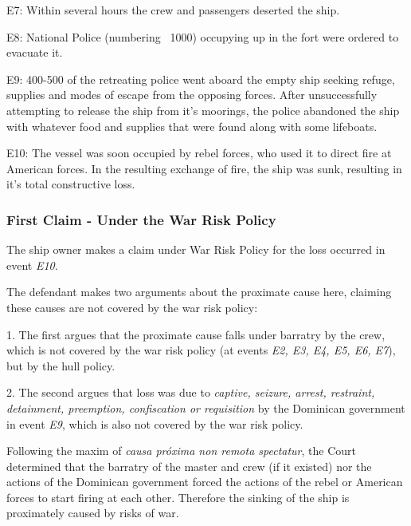 E7: Within several hours the crew and passengers deserted the ship.

E8: National Police (numbering ~1000) occupying up in the fort were ordered to evacuate it.  

E9: 400-500 of the retreating police went aboard the empty ship seeking refuge, supplies and modes of escape from the opposing forces. After unsuccessfully attempting to release the ship from it's moorings, the police abandoned the ship with whatever food and supplies that were found along with some lifeboats.

E10: The vessel was soon occupied by rebel forces, who used it to direct fire at American forces. In the resulting exchange of fire, the ship was sunk, resulting in it's total constructive loss.


\subsubsection{First Claim - Under the War Risk Policy}

    The ship owner makes a claim under War Risk Policy for the loss occurred in event \textit{E10}.
    
    The defendant makes two arguments about the proximate cause here, claiming these causes are not covered by the war risk policy:
    
    1. The first argues that the proximate cause falls under barratry by the crew, which is not covered by the war risk policy (at events \textit{E2, E3, E4, E5, E6, E7}), but by the hull policy.
    
    2. The second argues that loss was due to \textit{captive, seizure, arrest, restraint, detainment, preemption, confiscation or requisition} by the Dominican government in event \textit{E9}, which is also not covered by the war risk policy.
    
    Following the maxim of \textit{causa próxima non remota spectatur}, the Court determined that the barratry of the master and crew (if it existed) nor the actions of the Dominican government forced the actions of the rebel or American forces to start firing at each other. Therefore the sinking of the ship is proximately caused by risks of war.
    
